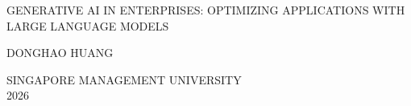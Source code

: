 \documentclass[a4paper,12pt,singleside]{report}
\def\authorname{Donghao HUANG}
\def\titletext{Generative AI in Enterprises: Optimizing Applications with Large Language Models}
\begin{document}
    
\vspace*{2cm}
\thispagestyle{empty}

\newcommand{\gradyear}{2026}
\date{\gradyear}

\begin{center}
{\Large \MakeUppercase{\titletext}}
\end{center}
\vfill
\begin{center}
    {\Large \MakeUppercase{\authorname}}
\end{center}
\vfill
\begin{center}
    {\Large SINGAPORE MANAGEMENT UNIVERSITY}\\
    {\Large \gradyear}
\end{center}

\vspace*{2cm}
\end{document}
